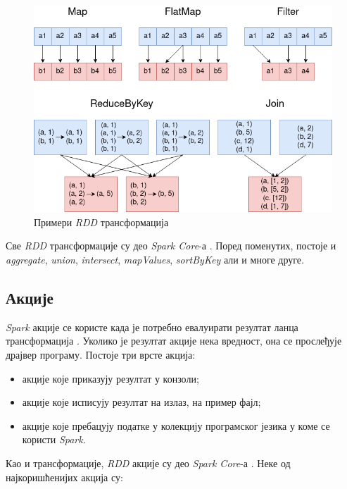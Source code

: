 \documentclass[12pt,oneside]{memoir}
\begin{document}
\begin{figure}[!ht]
  \centering
  \includegraphics[width=1\textwidth]{pictures/transf_examples.png}
  \caption{Примери \textit{RDD} трансформација}
  \label{fig:sprk_trnsf_examples}
\end{figure}

Све \textit{RDD} трансформације су део \textit{Spark Core}-а \cite{spark_rdd_transf}. Поред поменутих, постоје и \textit{aggregate}, \textit{union}, \textit{intersect}, \textit{mapValues}, \textit{sortByKey} али и многе друге.


\subsection{Акције}
\label{subsec:spark_akc}

\textit{Spark} акције се користе када је потребно евалуирати резултат ланца трансформација \cite{spark_guide}. Уколико је резултат акције нека вредност, она се прослеђује драјвер програму. Постоје три врсте акција:

\begin{itemize}
\item акције које приказују резултат у конзоли;
\item акције које исписују резултат на излаз, на пример фајл;
\item акције које пребацују податке у колекцију програмског језика у коме се користи \textit{Spark}.
\end{itemize}

Као и трансформације, \textit{RDD} акције су део \textit{Spark Core}-а  \cite{spark_rdd_transf}. Неке од најкоришћенијих акција су:
\end{document}
